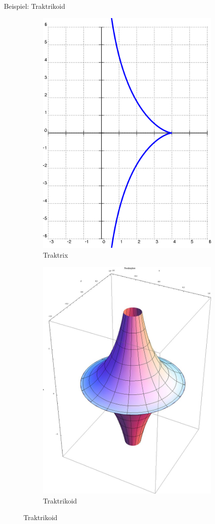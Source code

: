 \documentclass[12pt]{beamer}
\begin{document}
\begin{frame}{Beispiel: Traktrikoid}

\begin{figure}
\begin{subfigure}{.5\textwidth}
  \centering
  \includegraphics[width=.8\linewidth]{traktrix.png}
  \caption{Traktrix}
\end{subfigure}%
\begin{subfigure}{.5\textwidth}
  \centering
  \includegraphics[width=.8\linewidth]{pseudosphere.png}
  \caption{Traktrikoid}
\end{subfigure}


\end{figure}
\end{frame}
\end{document}
